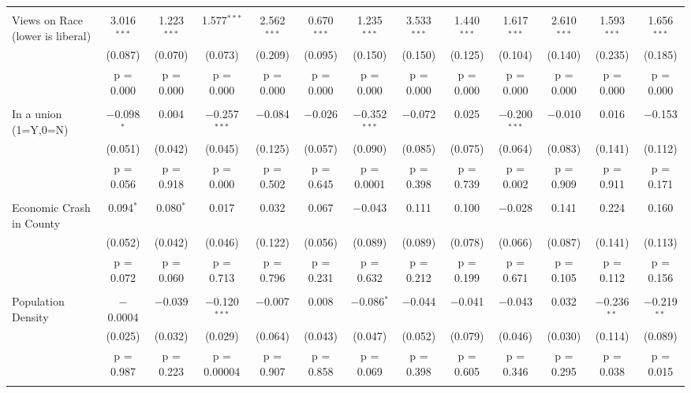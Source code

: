 \begin{longtable}{@{\extracolsep{5pt}}lcccccccccccc}
  & & & & & & & & & & & & \\ 
 Views on Race (lower is liberal) & 3.016$^{***}$ & 1.223$^{***}$ & 1.577$^{***}$ & 2.562$^{***}$ & 0.670$^{***}$ & 1.235$^{***}$ & 3.533$^{***}$ & 1.440$^{***}$ & 1.617$^{***}$ & 2.610$^{***}$ & 1.593$^{***}$ & 1.656$^{***}$ \\ 
  & (0.087) & (0.070) & (0.073) & (0.209) & (0.095) & (0.150) & (0.150) & (0.125) & (0.104) & (0.140) & (0.235) & (0.185) \\ 
  & p = 0.000 & p = 0.000 & p = 0.000 & p = 0.000 & p = 0.000 & p = 0.000 & p = 0.000 & p = 0.000 & p = 0.000 & p = 0.000 & p = 0.000 & p = 0.000 \\ 
  & & & & & & & & & & & & \\ 
 In a union (1=Y,0=N) & $-$0.098$^{*}$ & 0.004 & $-$0.257$^{***}$ & $-$0.084 & $-$0.026 & $-$0.352$^{***}$ & $-$0.072 & 0.025 & $-$0.200$^{***}$ & $-$0.010 & 0.016 & $-$0.153 \\ 
  & (0.051) & (0.042) & (0.045) & (0.125) & (0.057) & (0.090) & (0.085) & (0.075) & (0.064) & (0.083) & (0.141) & (0.112) \\ 
  & p = 0.056 & p = 0.918 & p = 0.000 & p = 0.502 & p = 0.645 & p = 0.0001 & p = 0.398 & p = 0.739 & p = 0.002 & p = 0.909 & p = 0.911 & p = 0.171 \\ 
  & & & & & & & & & & & & \\ 
 Economic Crash in County & 0.094$^{*}$ & 0.080$^{*}$ & 0.017 & 0.032 & 0.067 & $-$0.043 & 0.111 & 0.100 & $-$0.028 & 0.141 & 0.224 & 0.160 \\ 
  & (0.052) & (0.042) & (0.046) & (0.122) & (0.056) & (0.089) & (0.089) & (0.078) & (0.066) & (0.087) & (0.141) & (0.113) \\ 
  & p = 0.072 & p = 0.060 & p = 0.713 & p = 0.796 & p = 0.231 & p = 0.632 & p = 0.212 & p = 0.199 & p = 0.671 & p = 0.105 & p = 0.112 & p = 0.156 \\ 
  & & & & & & & & & & & & \\ 
 Population Density & $-$0.0004 & $-$0.039 & $-$0.120$^{***}$ & $-$0.007 & 0.008 & $-$0.086$^{*}$ & $-$0.044 & $-$0.041 & $-$0.043 & 0.032 & $-$0.236$^{**}$ & $-$0.219$^{**}$ \\ 
  & (0.025) & (0.032) & (0.029) & (0.064) & (0.043) & (0.047) & (0.052) & (0.079) & (0.046) & (0.030) & (0.114) & (0.089) \\ 
  & p = 0.987 & p = 0.223 & p = 0.00004 & p = 0.907 & p = 0.858 & p = 0.069 & p = 0.398 & p = 0.605 & p = 0.346 & p = 0.295 & p = 0.038 & p = 0.015 \\ 
  & & & & & & & & & & & & \\ 

\end{longtable}
